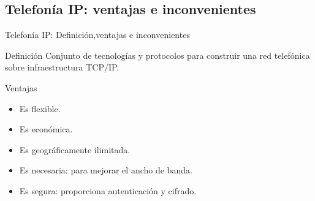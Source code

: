 \documentclass{beamer}
\begin{document}
\subsection{Telefonía IP: ventajas e inconvenientes}
\label{sec:telefonia-ip}
\begin{frame}{Telefonía IP: Definición,ventajas e inconvenientes}

  \begin{block}{Definición}
    Conjunto de tecnologías y protocolos para construir una red telefónica sobre infraestructura TCP/IP. 
  \end{block}
  \begin{block}{Ventajas}
    \begin{itemize}
    \item Es flexible.
    \item Es económica.
    \item Es geográficamente ilimitada.
    \item Es necesaria: para mejorar el ancho de banda.
    \item Es segura: proporciona autenticación y cifrado.
   \end{itemize}
 \end{block}
 

\end{frame}


\end{document}

